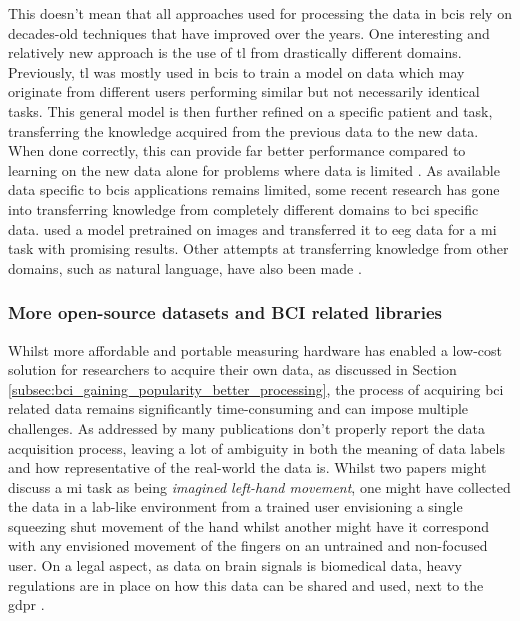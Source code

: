 This doesn't mean that all approaches used for processing the data in \glspl{bci} rely on decades-old techniques that have improved over the years.
One interesting and relatively new approach is the use of \gls{tl} from drastically different domains.
Previously, \gls{tl} was mostly used in \glspl{bci} to train a model on data which may originate from different users performing similar but not necessarily identical tasks.
This general model is then further refined on a specific patient and task, transferring the knowledge acquired from the previous data to the new data.
When done correctly, this can provide far better performance compared to learning on the new data alone for problems where data is limited \citep{bci_review_arnau}.
As available data specific to \glspl{bci} applications remains limited, some recent research has gone into transferring knowledge from completely different domains to \gls{bci} specific data.
 used a model pretrained on images and transferred it to \gls{eeg} data for a \gls{mi} task with promising results.
Other attempts at transferring knowledge from other domains, such as natural language, have also been made \citep{thesis_wolf}.



\subsubsection{More open-source datasets and BCI related libraries}
\label{subsubsec:bci_gaining_popularity_improved_data_processing_open_source_data_code}

Whilst more affordable and portable measuring hardware has enabled a low-cost solution for researchers to acquire their own data, as discussed in Section \ref{subsec:bci_gaining_popularity_better_processing}, the process of acquiring \gls{bci} related data remains significantly time-consuming and can impose multiple challenges.
As addressed by \citet{bci_review_arnau} many publications don't properly report the data acquisition process, leaving a lot of ambiguity in both the meaning of data labels and how representative of the real-world the data is.
Whilst two papers might discuss a \gls{mi} task as being \textit{imagined left-hand movement}, one might have collected the data in a lab-like environment from a trained user envisioning a single squeezing shut movement of the hand whilst another might have it correspond with any envisioned movement of the fingers on an untrained and non-focused user.
On a legal aspect, as data on brain signals is biomedical data, heavy regulations are in place on how this data can be shared and used, next to the \gls{gdpr} \citep{gdpr_data_sharing, biomedical_data_privacy}.

